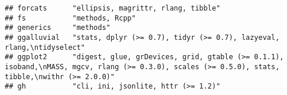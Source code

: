 \documentclass[]{book}
\begin{document}
\begin{verbatim}
## forcats      "ellipsis, magrittr, rlang, tibble"                                                                                                                                                                                                                                                                                                                                                                                                                                                                         
## fs           "methods, Rcpp"                                                                                                                                                                                                                                                                                                                                                                                                                                                                                             
## generics     "methods"                                                                                                                                                                                                                                                                                                                                                                                                                                                                                                   
## ggalluvial   "stats, dplyr (>= 0.7), tidyr (>= 0.7), lazyeval, rlang,\ntidyselect"                                                                                                                                                                                                                                                                                                                                                                                                                                       
## ggplot2      "digest, glue, grDevices, grid, gtable (>= 0.1.1), isoband,\nMASS, mgcv, rlang (>= 0.3.0), scales (>= 0.5.0), stats, tibble,\nwithr (>= 2.0.0)"                                                                                                                                                                                                                                                                                                                                                             
## gh           "cli, ini, jsonlite, httr (>= 1.2)"                                                                                                                                                                                                                                                                                                                                                                                                                                                                         

\end{verbatim}
\end{document}

